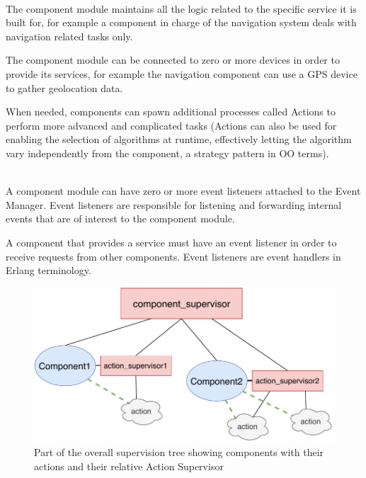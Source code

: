 \documentclass{memoir}
\begin{document}
\begin{description}
	\addtolength{\itemindent}{0.2cm}
	\item[The component module:] \hfill \\
The component module maintains all the logic related to the specific service it is built for, for example a component in charge of the navigation system deals with navigation related tasks only.

The component module can be connected to zero or more devices in order to provide its services, for example the navigation component can use a GPS device to gather geolocation data. 


When needed, components can spawn additional processes called Actions to perform more advanced and complicated tasks (Actions can also be used for enabling the selection of algorithms at runtime, effectively letting the algorithm vary independently from the component, a strategy pattern in OO terms).

	
	\item[The event Listener:] \hfill \\
A component module can have zero or more event listeners attached to the Event Manager. Event listeners are responsible for listening and forwarding internal events that are of interest to the component module.

A component that provides a service must have an event listener in order to receive requests from other components. Event listeners are event handlers in Erlang terminology.
	
\end{description}

\begin{figure}
	\centering
	\includegraphics[width=0.7\linewidth]{implementation_details/component_and_action.pdf}
	\caption{Part of the overall supervision tree showing components with their actions and their relative Action Supervisor}
	\label{fig:component-and-action}
\end{figure}
\end{document}
